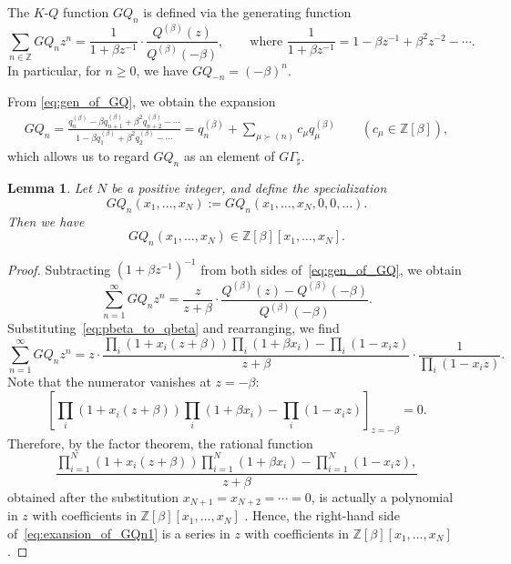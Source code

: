\documentclass[dvipdfmx]{amsart}
\newtheorem{lemma}[thm]{Lemma}
\theoremstyle{definition}
\theoremstyle{remark}
\begin{document}
The \( K \)-\( Q \) function \( GQ_n \) is defined via the generating function~\cite{HUDSON2017115}
\begin{equation}\label{eq:gen_of_GQ}
\sum_{n \in \mathbb{Z}} GQ_n z^n = 
\frac{1}{1 + \beta z^{-1}} \cdot \frac{Q^{(\beta)}(z)}{Q^{(\beta)}(-\beta)}, 
\qquad 
\text{where } \frac{1}{1 + \beta z^{-1}} = 1 - \beta z^{-1} + \beta^2 z^{-2} - \cdots.
\end{equation}  
In particular, for \( n \geq 0 \), we have \( GQ_{-n} = (-\beta)^n \).

From \eqref{eq:gen_of_GQ}, we obtain the expansion
\begin{equation}\label{eq:exp_of_GQ}
\begin{aligned}
GQ_n =
\frac{q_n^{(\beta)} - \beta q_{n+1}^{(\beta)} + \beta^2 q_{n+2}^{(\beta)} - \cdots}
{1 - \beta q_1^{(\beta)} + \beta^2 q_2^{(\beta)} - \cdots}
=
q_n^{(\beta)} + \sum_{\mu \succ (n)} c_\mu q_\mu^{(\beta)}
\qquad (c_\mu \in \mathbb{Z}[\beta]),
\end{aligned}
\end{equation}
which allows us to regard \( GQ_n \) as an element of \( G\Gamma_\sharp \).

\begin{lemma}\label{lemma:finiteness_of_GQ}
Let \( N \) be a positive integer, and define the specialization
\[
GQ_n(x_1, \dots, x_N) := GQ_n(x_1, \dots, x_N, 0, 0, \dots).
\]
Then we have
\[
GQ_n(x_1, \dots, x_N) \in \mathbb{Z}[\beta][x_1, \dots, x_N].
\]
\end{lemma}

\begin{proof}
Subtracting \( (1 + \beta z^{-1})^{-1} \) from both sides of~\eqref{eq:gen_of_GQ}, we obtain
\begin{equation}\label{eq:gen_of_GQ_2}
\sum_{n = 1}^\infty GQ_n z^n = 
\frac{z}{z + \beta} \cdot \frac{Q^{(\beta)}(z) - Q^{(\beta)}(-\beta)}{Q^{(\beta)}(-\beta)}.
\end{equation}
Substituting~\eqref{eq:pbeta_to_qbeta} and rearranging, we find
\begin{equation}\label{eq:exansion_of_GQn1}
\sum_{n = 1}^\infty GQ_n z^n =
z \cdot 
\frac{
\prod_i (1 + x_i(z + \beta)) \prod_i (1 + \beta x_i) - \prod_i (1 - x_i z)
}{z + \beta}
\cdot 
\frac{1}{\prod_i (1 - x_i z)}.
\end{equation}
Note that the numerator vanishes at \( z = -\beta \):
\[
\left[
\prod_i (1 + x_i(z + \beta)) \prod_i (1 + \beta x_i) - \prod_i (1 - x_i z)
\right]_{z = -\beta} = 0.
\]
Therefore, by the factor theorem, the rational function
\[
\frac{
\prod_{i=1}^N (1 + x_i(z + \beta)) \prod_{i=1}^N (1 + \beta x_i) - \prod_{i=1}^N (1 - x_i z),
}{z + \beta}
\]
obtained after the substitution \( x_{N+1} = x_{N+2} = \cdots = 0 \), is actually a polynomial in \( z \) with coefficients in \( \mathbb{Z}[\beta][x_1, \dots, x_N] \) .  
Hence, the right-hand side of~\eqref{eq:exansion_of_GQn1} is a series in \( z \) with coefficients in \( \mathbb{Z}[\beta][x_1, \dots, x_N] \).
\end{proof}
\end{document}

